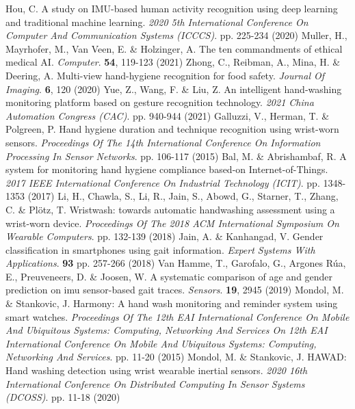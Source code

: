 \begin{thebibliography}{99}
    Hou, C. A study on IMU-based human activity recognition using deep learning and traditional machine learning. {\em 2020 5th International Conference On Computer And Communication Systems (ICCCS)}. pp. 225-234 (2020)
    Muller, H., Mayrhofer, M., Van Veen, E. \& Holzinger, A. The ten commandments of ethical medical AI. {\em Computer}. \textbf{54}, 119-123 (2021)
    Zhong, C., Reibman, A., Mina, H. \& Deering, A. Multi-view hand-hygiene recognition for food safety. {\em Journal Of Imaging}. \textbf{6}, 120 (2020)
    Yue, Z., Wang, F. \& Liu, Z. An intelligent hand-washing monitoring platform based on gesture recognition technology. {\em 2021 China Automation Congress (CAC)}. pp. 940-944 (2021)
    Galluzzi, V., Herman, T. \& Polgreen, P. Hand hygiene duration and technique recognition using wrist-worn sensors. {\em Proceedings Of The 14th International Conference On Information Processing In Sensor Networks}. pp. 106-117 (2015)
    Bal, M. \& Abrishambaf, R. A system for monitoring hand hygiene compliance based-on Internet-of-Things. {\em 2017 IEEE International Conference On Industrial Technology (ICIT)}. pp. 1348-1353 (2017)
    Li, H., Chawla, S., Li, R., Jain, S., Abowd, G., Starner, T., Zhang, C. \& Plötz, T. Wristwash: towards automatic handwashing assessment using a wrist-worn device. {\em Proceedings Of The 2018 ACM International Symposium On Wearable Computers}. pp. 132-139 (2018)
    Jain, A. \& Kanhangad, V. Gender classification in smartphones using gait information. {\em Expert Systems With Applications}. \textbf{93} pp. 257-266 (2018)
    Van Hamme, T., Garofalo, G., Argones Rúa, E., Preuveneers, D. \& Joosen, W. A systematic comparison of age and gender prediction on imu sensor-based gait traces. {\em Sensors}. \textbf{19}, 2945 (2019)
    Mondol, M. \& Stankovic, J. Harmony: A hand wash monitoring and reminder system using smart watches. {\em Proceedings Of The 12th EAI International Conference On Mobile And Ubiquitous Systems: Computing, Networking And Services On 12th EAI International Conference On Mobile And Ubiquitous Systems: Computing, Networking And Services}. pp. 11-20 (2015)
    Mondol, M. \& Stankovic, J. HAWAD: Hand washing detection using wrist wearable inertial sensors. {\em 2020 16th International Conference On Distributed Computing In Sensor Systems (DCOSS)}. pp. 11-18 (2020)

\end{thebibliography}

